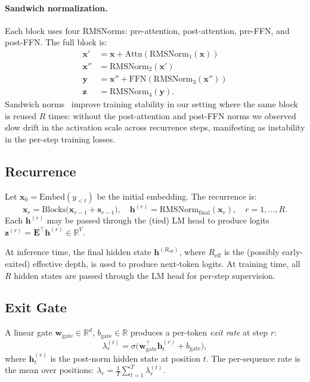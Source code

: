 \documentclass[11pt,a4paper]{article}
\begin{document}
\paragraph{Sandwich normalization.}
Each block uses four RMSNorms: pre-attention, post-attention, pre-FFN, and
post-FFN. The full block is:
\begin{align}
\mathbf{x}' &= \mathbf{x} + \mathrm{Attn}(\mathrm{RMSNorm}_1(\mathbf{x})) \\
\mathbf{x}'' &= \mathrm{RMSNorm}_2(\mathbf{x}') \\
\mathbf{y} &= \mathbf{x}'' + \mathrm{FFN}(\mathrm{RMSNorm}_3(\mathbf{x}'')) \\
\mathbf{z} &= \mathrm{RMSNorm}_4(\mathbf{y}).
\end{align}
Sandwich norms~\cite{sandwich-norm} improve training stability in our setting
where the same block is reused $R$ times: without the post-attention and
post-FFN norms we observed slow drift in the activation scale across
recurrence steps, manifesting as instability in the per-step training losses.

\subsection{Recurrence}

Let $\mathbf{x}_0 = \mathrm{Embed}(y_{<t})$ be the initial embedding. The
recurrence is:
\begin{equation}
\mathbf{x}_r = \mathrm{Blocks}\bigl( \mathbf{x}_{r-1} + \mathbf{s}_{r-1} \bigr),
\quad
\mathbf{h}^{(r)} = \mathrm{RMSNorm}_{\mathrm{final}}(\mathbf{x}_r),
\quad r = 1, \ldots, R.
\end{equation}
Each $\mathbf{h}^{(r)}$ may be passed through the (tied) LM head to produce
logits $\mathbf{z}^{(r)} = \mathbf{E}^\top \mathbf{h}^{(r)} \in \mathbb{R}^{V}$.

At inference time, the final hidden state $\mathbf{h}^{(R_{\mathrm{eff}})}$,
where $R_{\mathrm{eff}}$ is the (possibly early-exited) effective depth, is
used to produce next-token logits. At training time, all $R$ hidden states
are passed through the LM head for per-step supervision.

\subsection{Exit Gate}

A linear gate $\mathbf{w}_{\mathrm{gate}} \in \mathbb{R}^{d}$, $b_{\mathrm{gate}} \in \mathbb{R}$ produces a
per-token \emph{exit rate} at step $r$:
\begin{equation}
\lambda_r^{(t)} = \sigma\bigl(\mathbf{w}_{\mathrm{gate}}^\top \mathbf{h}_t^{(r)} + b_{\mathrm{gate}}\bigr),
\end{equation}
where $\mathbf{h}_t^{(r)}$ is the post-norm hidden state at position $t$.
The per-sequence rate is the mean over positions: $\lambda_r =
\frac{1}{T}\sum_{t=1}^T \lambda_r^{(t)}$.
\end{document}
